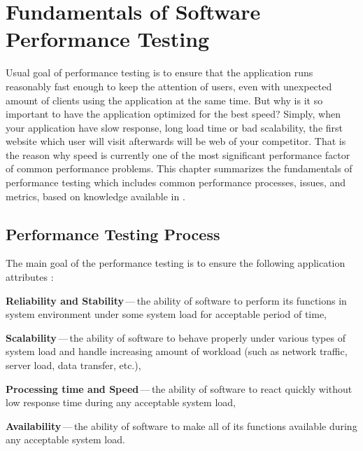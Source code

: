 
\chapter{Fundamentals of Software Performance Testing}
\label{Fundamentals of Software Performance Testing}
Usual goal of performance testing is to ensure that the application runs reasonably fast enough to keep the attention of users, even with unexpected amount of clients using the application at the same time. But why is it so important to have the application optimized for the best speed? Simply, when your application have slow response, long load time or bad scalability, the first website which user will visit afterwards will be web of your competitor. That is the reason why speed is currently one of the most significant performance factor of common performance problems. This chapter summarizes the fundamentals of performance testing which includes common performance processes, issues, and metrics, based on knowledge available in \cite{Molyneaux:TAoAPT, Kurkova:Thesis:2017, DIN:PHD, ISTQB}.


\section{Performance Testing Process}
\label{Performance Testing Process}
The main goal of the performance testing is to ensure the following application attributes \cite{GAO:MEASURING}:

\begin{description}
	\setlength\itemsep{0em}
	\item \textbf{Reliability and Stability}\,---\,the ability of software to perform its functions in system environment under some system load for acceptable period of time,
	\item \textbf{Scalability}\,---\,the ability of software to behave properly under various types of system load and handle increasing amount of workload (such as network traffic, server load, data transfer, etc.),
	\item \textbf{Processing time and Speed}\,---\,the ability of software to react quickly without low response time during any acceptable system load,
	\item \textbf{Availability}\,---\,the ability of software to make all of its functions available during any acceptable system load.
\end{description}

